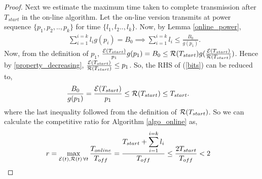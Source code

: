 \begin{proof}
%

Next we estimate the maximum time taken to complete transmission after $T_{start}$ in the on-line algorithm. Let the on-line version transmits at power sequence $\{p_1,p_2,..,p_k\}$ for time $\{l_1,l_2..,l_k\} $. Now, by Lemma \ref{online_power},
\begin{align}
&\sum_{i=1}^{i=k}l_ig(p_i)=B_0\implies\sum_{i=1}^{i=k}l_i\le \frac{B_0}{g(p_1)}.\label{bits}
\end{align}
Now, from the definition of $p_1$, $\frac{\mathcal{E}(T_{start})}{p_1}g(p_1)=B_0 \le \mathcal{R}(T_{start}) g(\frac{\mathcal{E}(T_{start})}{\mathcal{R}(T_{start})})$. Hence by \eqref{property_decreasing}, $\frac{\mathcal{E}(T_{start})}{\mathcal{R}(T_{start})}\le p_1$. So, the RHS of (\ref{bits}) can be reduced to, 
\begin{align}
&\frac{B_0}{g(p_1)} = \frac{\mathcal{E}(T_{start})}{p_1} \le \mathcal{R}(T_{start})\le T_{start}.
\end{align}
where the last inequality followed from the definition of $\mathcal{R}(T_{start})$. So we can calculate the competitive ratio for Algorithm \ref{algo_online} as,
\begin{align*}
&r=\displaystyle\max_{\mathcal{E}(t),\mathcal{R}(t)\hspace{0.5mm} \forall t}\dfrac{T_{online}}{T_{off}} = \dfrac{T_{start}+\displaystyle\sum_{i=1}^{i=k}l_i}{T_{off}} \le \dfrac{2 T_{start}}{T_{off}} < 2
\end{align*}
\end{proof}
